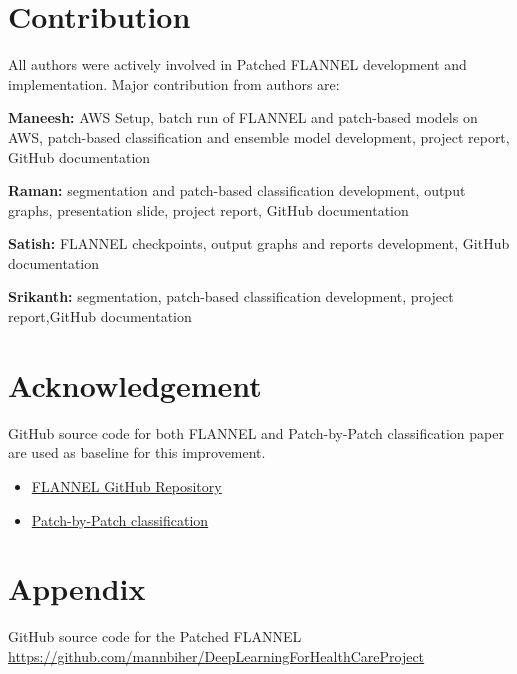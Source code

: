\documentclass{sigkddExp}
\begin{document}
\section{Contribution}

All authors were actively involved in Patched FLANNEL development and
implementation. Major contribution from authors are:

\textbf{Maneesh:} AWS Setup, batch run of FLANNEL and patch-based models on
AWS, patch-based classification and ensemble model development, project
report, GitHub documentation

\textbf{Raman:} segmentation and patch-based classification development,
output graphs, presentation slide, project report, GitHub
documentation

\textbf{Satish:} FLANNEL checkpoints, output graphs and reports development,
GitHub documentation

\textbf{Srikanth:} segmentation, patch-based classification development, project
report,GitHub documentation





\section{Acknowledgement}
GitHub source code for both FLANNEL and Patch-by-Patch classification
\cite{pmid32396075} paper are used as baseline for this improvement.
\begin{itemize}
    \item \href{https://github.com/qxiaobu/FLANNEL}{FLANNEL GitHub Repository}
    \item \href{https://github.com/jongcye/Deep-Learning-COVID-19-on-CXR-using-Limited-Training-Data-Sets}
          {Patch-by-Patch classification}
\end{itemize}


\section{Appendix}
GitHub source code for the Patched FLANNEL
\url{https://github.com/mannbiher/DeepLearningForHealthCareProject}

\clearpage
%

\end{document}
